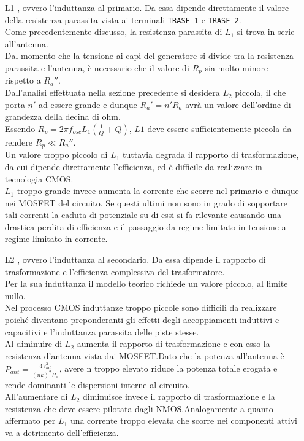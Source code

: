\documentclass[a4paper, 12pt]{memoir}
\begin{document}
\begin{enumerate}
\item[L1], ovvero l'induttanza al primario. Da essa dipende direttamente il
	valore della resistenza parassita vista ai terminali \texttt{TRASF\_1} e
	\texttt{TRASF\_2}.\\
	Come precedentemente discusso, la resistenza parassita di $L_1$
	si trova in serie all'antenna.\\
	Dal momento che la tensione ai capi del generatore si divide tra la
	resistenza parassita e l'antenna, è necessario che il valore di $R_p$
	sia molto minore rispetto a $R_a''$.\\
	Dall'analisi effettuata nella sezione precedente si desidera $L_2$ 
	piccola, il che porta $n'$ ad essere grande e dunque $R_a' = n'R_a$ avrà
	un valore dell'ordine di grandezza della decina di ohm.\\
	Essendo $R_p = 2\pi f_{osc} L_1 \left(\frac{1}{Q} + Q \right)$, $L1$ deve
	essere sufficientemente piccola da rendere $R_p \ll R_a''$.\\
	Un valore troppo piccolo di $L_1$ tuttavia degrada il rapporto di
	trasformazione, da cui dipende direttamente l'efficienza, ed è
	difficile da realizzare in tecnologia CMOS.\\
	$L_1$ troppo grande invece aumenta la corrente che scorre nel primario e
	dunque nei MOSFET del circuito. Se questi ultimi non sono in grado di
	sopportare tali correnti la caduta di potenziale su di essi si fa 
	rilevante causando una drastica perdita di efficienza e il passaggio da
	regime limitato in tensione a regime limitato in corrente.

\item[L2], ovvero l'induttanza al secondario. Da essa dipende il rapporto di
	trasformazione e l'efficienza complessiva del trasformatore.\\
	Per la sua induttanza il modello teorico richiede un valore piccolo, al
	limite nullo.\\
	Nel processo CMOS induttanze troppo piccole sono difficili da realizzare
	poiché diventano preponderanti gli effetti degli
	accoppiamenti induttivi e capacitivi e l'induttanza parassita delle piste
	stesse\cite{RazaviRF}.\\
	Al diminuire di $L_2$ aumenta il rapporto di trasformazione e con esso la
	resistenza d'antenna vista dai MOSFET.\@ Dato che la potenza all'antenna è
	$P_{ant}= \frac{4V_{dd}^2}{(nk)^2R_a}$, avere n troppo elevato riduce la
	potenza totale erogata e rende dominanti le dispersioni interne al
	circuito.\\
	All'aumentare di $L_2$ diminuisce invece il rapporto di trasformazione e
	la resistenza che deve essere pilotata dagli NMOS.\@ Analogamente a
	quanto affermato per $L_1$ una corrente troppo elevata che scorre nei
	componenti attivi va a detrimento dell'efficienza.


\end{enumerate}
\end{document}
